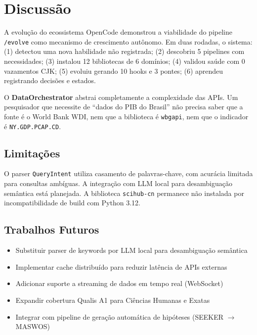 \documentclass[12pt,a4paper]{article}
\begin{document}
\section{Discussão}

A evolução do ecossistema OpenCode demonstrou a viabilidade do pipeline \texttt{/evolve} como mecanismo de crescimento autônomo. Em duas rodadas, o sistema: (1) detectou uma nova habilidade não registrada; (2) descobriu 5 pipelines com necessidades; (3) instalou 12 bibliotecas de 6 domínios; (4) validou saúde com 0 vazamentos CJK; (5) evoluiu gerando 10 hooks e 3 pontes; (6) aprendeu registrando decisões e estados.

O \textbf{DataOrchestrator} abstrai completamente a complexidade das APIs. Um pesquisador que necessite de ``dados do PIB do Brasil'' não precisa saber que a fonte é o World Bank WDI, nem que a biblioteca é \texttt{wbgapi}, nem que o indicador é \texttt{NY.GDP.PCAP.CD}.

\subsection{Limitações}

O parser \texttt{QueryIntent} utiliza casamento de palavras-chave, com acurácia limitada para consultas ambíguas. A integração com LLM local para desambiguação semântica está planejada. A biblioteca \texttt{scihub-cn} permanece não instalada por incompatibilidade de build com Python 3.12.

\subsection{Trabalhos Futuros}

\begin{itemize}[itemsep=1pt]
  \item Substituir parser de keywords por LLM local para desambiguação semântica
  \item Implementar cache distribuído para reduzir latência de APIs externas
  \item Adicionar suporte a streaming de dados em tempo real (WebSocket)
  \item Expandir cobertura Qualis A1 para Ciências Humanas e Exatas
  \item Integrar com pipeline de geração automática de hipóteses (SEEKER $\rightarrow$ MASWOS)
\end{itemize}
\end{document}
